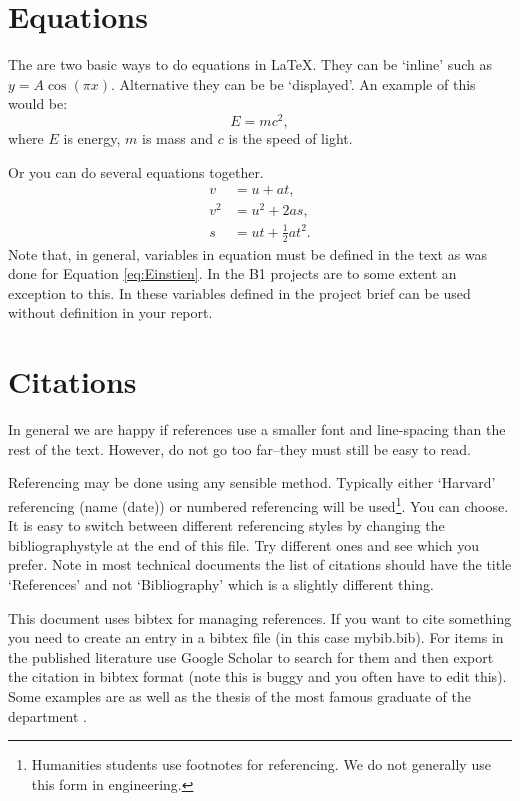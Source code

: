 \documentclass[11pt]{article}
\begin{document}
\section{Equations}
The are two basic ways to do equations in \LaTeX. They can be `inline' such as $y=A\cos\left(\pi x\right)$. Alternative they can be be `displayed'. An example of this would be:
\begin{equation}
    E=mc^2,
    \label{eq:Einstien}
\end{equation}
where $E$ is energy, $m$ is mass and $c$ is the speed of light.

Or you can do several equations together.
\begin{align}
    v&=u+a t,\label{eq:SUVAT1}\\
    v^2&=u^2+2 a s,\\
    s&=ut+\frac{1}{2}at^2.\label{eq:SUVAT3}
\end{align}
Note that, in general, variables in equation must be defined in the text as was done for Equation \ref{eq:Einstien}. In the B1 projects are to some extent an exception to this. In these variables defined in the project brief can be used without definition in your report.



\section{Citations}

In general we are happy if references use a smaller font and line-spacing than the rest of the text. However, do not go too far--they must still be easy to read.

Referencing may be done using any sensible method. Typically either `Harvard' referencing (name (date)) or numbered referencing will be used\footnote{Humanities students use footnotes for referencing. We do not generally use this form in engineering.}. You can choose. It is easy to switch between different referencing styles by changing the bibliographystyle at the end of this file. Try different ones and see which you prefer. Note in most technical documents the list of citations should have the title `References' and not `Bibliography' which is a slightly different thing.

This document uses bibtex for managing references. If you want to cite something you need to create an entry in a bibtex file (in this case mybib.bib). For items in the published literature use Google Scholar to search for them and then export the citation in bibtex format (note this is buggy and you often have to edit this). Some examples are  \cite{WilliamsTodd,coussios2008applications,mei2009constant} as well as the thesis of the most famous graduate of the department \cite{RowanAtkinsonthesis}. 
\end{document}
